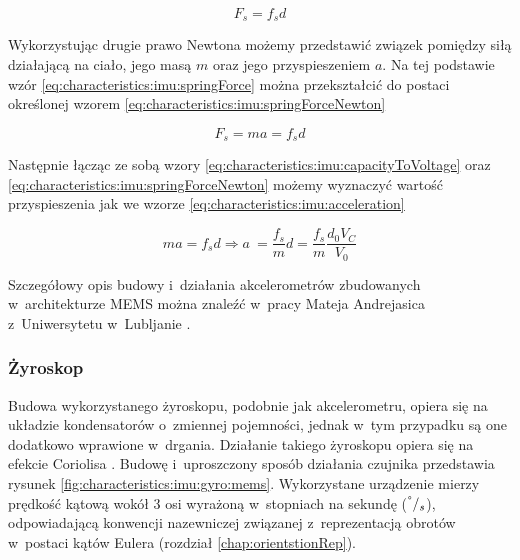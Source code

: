 \begin{equation}
	F_s = f_s d
	\label{eq:characteristics:imu:springForce}
\end{equation}	
																																												
Wykorzystując drugie prawo Newtona możemy przedstawić związek pomiędzy siłą działającą na ciało, jego masą $m$ oraz jego przyspieszeniem $a$. Na tej podstawie wzór \ref{eq:characteristics:imu:springForce} można przekształcić do postaci określonej wzorem \ref{eq:characteristics:imu:springForceNewton}
																																											
\begin{equation}
	F_s = ma = f_s d
	\label{eq:characteristics:imu:springForceNewton}
\end{equation}	
																																											
Następnie łącząc ze sobą wzory \ref{eq:characteristics:imu:capacityToVoltage} oraz \ref{eq:characteristics:imu:springForceNewton} możemy wyznaczyć wartość przyspieszenia jak we wzorze \ref{eq:characteristics:imu:acceleration}
																																											
\begin{equation}
	ma = f_s d \Rightarrow a~= \frac{f_s}{m} d = \frac{f_s}{m} \frac{d_0 V_C}{V_0}
	\label{eq:characteristics:imu:acceleration}
\end{equation}
																																											
Szczegółowy opis budowy i~działania akcelerometrów zbudowanych w~architekturze MEMS można znaleźć w~pracy Mateja Andrejasica z~Uniwersytetu w~Lubljanie \cite{Andrejasic2008}.
																																											
\subsubsection*{Żyroskop}
Budowa wykorzystanego żyroskopu, podobnie jak akcelerometru, opiera się na układzie kondensatorów o~zmiennej pojemności, jednak w~tym przypadku są one dodatkowo wprawione w~drgania. Działanie takiego żyroskopu opiera się na efekcie Coriolisa . Budowę i~uproszczony sposób działania czujnika przedstawia rysunek \ref{fig:characteristics:imu:gyro:mems}. Wykorzystane urządzenie mierzy prędkość kątową wokół 3 osi wyrażoną w~stopniach na sekundę ($^\degree/_s$), odpowiadającą konwencji nazewniczej związanej z~reprezentacją obrotów w~postaci kątów Eulera (rozdział \ref{chap:orientstionRep}). 
																																													
